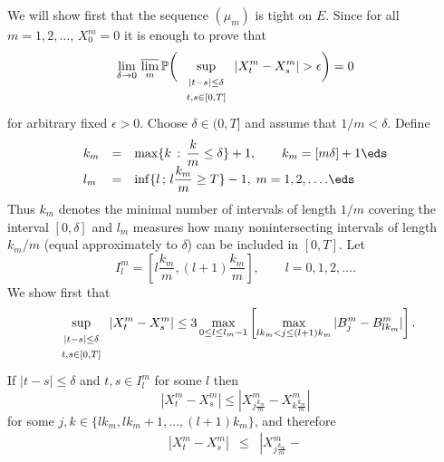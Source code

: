 \documentclass[preprint]{imsart}
\def\P{\mathbb P}
\def\ds{\displaystyle}
\begin{document}
{
We will show first that the sequence $(\mu_m)$ is tight
on $E$. Since for all $m=1,2,\ldots$, $X_0^m=0$ it is
enough to prove that
\begin{equation}\label{perdonsker2}
\lim_{\delta\to 0}\, \overline{\lim_m}\,
\P\bigg( \sup_{
\begin{array}{c}
\begin{scriptstyle}
|t-s|\leq \delta
\end{scriptstyle}
 \\ \begin{scriptstyle}
 t,s\in [0,T]
 \end{scriptstyle}
\end{array}
} |X_t^m-X_s^m|>\epsilon\bigg)=0
\end{equation}
for arbitrary fixed $\epsilon >0$. Choose $\delta\in
(0,T]$ and assume that $1/m<\delta$. Define
$$
  \begin{array}{lll}
    k_m&= & \ds
    \max \{k\, :\, \frac{k}{m}\leq\delta\}+1,
    \qquad k_m=[m\delta]+1
    \eds \\
    l_m&= & \ds
    \inf \{ l \, ;\, l\frac{k_m}{m}\geq T\} -1,
    \; m=1,2,\ldots .
    \eds
  \end{array}
$$
Thus $k_m$ denotes the minimal number of intervals of
length $1/m$ covering the interval $[0,\delta]$ and
$l_m$ measures how many nonintersecting intervals of
length $k_m/m$ (equal approximately to $\delta$) can be
included in $[0,T]$. Let
$$
I^m_l =\left[ l\frac{k_m}{m}, (l+1)\frac{k_m}{m}
\right],\qquad l=0,1,2,\ldots .
$$
We show first that
\begin{equation}\label{perdonsker3}
\sup_{
\begin{array}{c}
\begin{scriptstyle}
|t-s|\leq \delta
\end{scriptstyle}
 \\ \begin{scriptstyle}
 t,s\in [0,T]
 \end{scriptstyle}
\end{array}
} |X_t^m-X_s^m|
\leq
3\max_{0\leq l\leq l_m-1}\left[
\max_{lk_m<j\leq (l+1)k_m}
|B_j^m - B^m_{lk_m}|\right].
\end{equation}
If $|t-s|\leq\delta$ and $t,s\in I^m_l$ for some $l$
then
$$
|X_t^m-X_s^m|\leq \left| X^m_{j\frac{k_m}{m}} -
 X^m_{k\frac{k_m}{m}}\right|
$$
for some $j,k\in\{ lk_m,lk_m+1,\ldots,(l+1)k_m\}$, and
therefore
$$
  \begin{array}{lll}
    |X_t^m-X_s^m|&\leq & \ds
\left| X^m_{j\frac{k_m}{m}} -

\end{array}$$}
\end{document}
